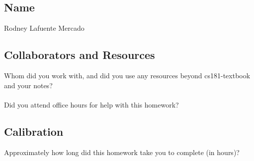 \documentclass[submit]{harvardml}
\begin{document}
\subsection*{Name}
Rodney Lafuente Mercado

\subsection*{Collaborators and Resources}
Whom did you work with, and did you use any resources beyond cs181-textbook and your notes?\\
\\
Did you attend office hours for help with this homework?

\subsection*{Calibration}
Approximately how long did this homework take you to complete (in hours)? 
\end{document}

